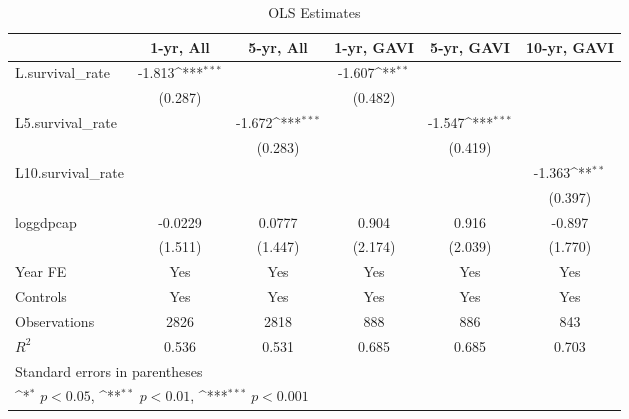 \begin{table}[htbp]\centering
\def\sym#1{\ifmmode^{#1}\else\(^{#1}\)\fi}
\caption{OLS Estimates}
\begin{tabular}{l*{5}{c}}
\hline\hline
                &\multicolumn{1}{c}{1-yr, All}&\multicolumn{1}{c}{5-yr, All}&\multicolumn{1}{c}{1-yr, GAVI}&\multicolumn{1}{c}{5-yr, GAVI}&\multicolumn{1}{c}{10-yr, GAVI}\\
\hline
L.survival\_rate &   -1.813\sym{***}&                  &   -1.607\sym{**} &                  &                  \\
                &  (0.287)         &                  &  (0.482)         &                  &                  \\
[1em]
L5.survival\_rate&                  &   -1.672\sym{***}&                  &   -1.547\sym{***}&                  \\
                &                  &  (0.283)         &                  &  (0.419)         &                  \\
[1em]
L10.survival\_rate&                  &                  &                  &                  &   -1.363\sym{**} \\
                &                  &                  &                  &                  &  (0.397)         \\
[1em]
loggdpcap       &  -0.0229         &   0.0777         &    0.904         &    0.916         &   -0.897         \\
                &  (1.511)         &  (1.447)         &  (2.174)         &  (2.039)         &  (1.770)         \\
[1em]
Year FE         &      Yes         &      Yes         &      Yes         &      Yes         &      Yes         \\
[1em]
Controls        &      Yes         &      Yes         &      Yes         &      Yes         &      Yes         \\
\hline
Observations    &     2826         &     2818         &      888         &      886         &      843         \\
\(R^{2}\)       &    0.536         &    0.531         &    0.685         &    0.685         &    0.703         \\
\hline\hline
\multicolumn{6}{l}{\footnotesize Standard errors in parentheses}\\
\multicolumn{6}{l}{\footnotesize \sym{*} \(p<0.05\), \sym{**} \(p<0.01\), \sym{***} \(p<0.001\)}\\
\end{tabular}
\end{table}
